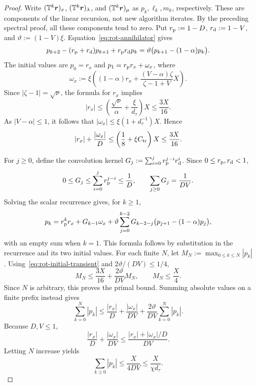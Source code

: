 \begin{proof}
Write \((\mathbb T^k\bm{r})_x\), \((\mathbb T^k\bm{r})_\lambda\), and
\((\mathbb T^k\bm{r})_\mu\) as \(p_k,\ell_k,m_k\), respectively.
These are components of the linear recursion, not new algorithm iterates.
By the preceding spectral proof, all these components tend to zero.
Put \(r_{\rm p}:=1-D\), \(r_{\rm d}:=1-V\), and
\(\vartheta:=(1-V)\xi\). Equation~\eqref{eq:rot-annihilator} gives
\[
p_{k+2}-(r_{\rm p}+r_{\rm d})p_{k+1}+r_{\rm p}r_{\rm d}p_k
=\vartheta\bigl(p_{k+1}-(1-\alpha)p_k\bigr).
\]
The initial values are \(p_0=r_x\) and
\(p_1=r_{\rm p}r_x+\omega_x\), where
\[
\omega_x:=\xi\left((1-\alpha)r_x+
\frac{(V-\alpha)\zeta}{\zeta-1+V}X\right).
\]
Since \(|\zeta-1|=\sqrt\nu\), the formula for \(r_x\) implies
\[
|r_x|\le\left(\frac{\sqrt\nu}{\alpha}+\frac\xi{d_\tau}\right)X
\le\frac{3X}{16}.
\]
As \(|V-\alpha|\le1\), it follows that
\(|\omega_x|\le\xi(1+d_\tau^{-1})X\). Hence
\begin{equation}
\label{eq:rot-initial-transient}
|r_x|+\frac{|\omega_x|}D
\le\left(\frac18+\xi C_{\rm tr}\right)X\le\frac{3X}{16}.
\end{equation}

For \(j\ge0\), define the convolution kernel
\(G_j:=\sum_{i=0}^jr_{\rm p}^{j-i}r_{\rm d}^i\).
Since \(0\le r_{\rm p},r_{\rm d}<1\),
\[
0\le G_j\le\sum_{i=0}^jr_{\rm p}^{j-i}\le\frac1D,
\qquad \sum_{j\ge0}G_j=\frac1{DV}.
\]
Solving the scalar recurrence gives, for \(k\ge1\),
\[
p_k=r_{\rm p}^kr_x+G_{k-1}\omega_x+
\vartheta\sum_{j=0}^{k-2}G_{k-2-j}\bigl(p_{j+1}-(1-\alpha)p_j\bigr),
\]
with an empty sum when \(k=1\). This formula follows by substitution
in the recurrence and its two initial values.
For each finite \(N\), let \(M_N:=\max_{0\le k\le N}|p_k|\).
Using~\eqref{eq:rot-initial-transient} and \(2\vartheta/(DV)\le1/4\),
\[
M_N\le\frac{3X}{16}+\frac{2\vartheta}{DV}M_N,
\qquad M_N\le\frac X4.
\]
Since \(N\) is arbitrary, this proves the primal bound.
Summing absolute values on a finite prefix instead gives
\[
\sum_{k=0}^N|p_k|
\le\frac{|r_x|}D+\frac{|\omega_x|}{DV}
+\frac{2\vartheta}{DV}\sum_{k=0}^N|p_k|.
\]
Because \(D,V\le1\),
\[
\frac{|r_x|}D+\frac{|\omega_x|}{DV}
\le\frac{|r_x|+|\omega_x|/D}{DV}.
\]
Letting \(N\) increase yields
\begin{equation}
\label{eq:rot-transient-sum}
\sum_{k\ge0}|p_k|\le\frac X{4DV}\le\frac X{\chi d_\tau}.
\end{equation}


\end{proof}
